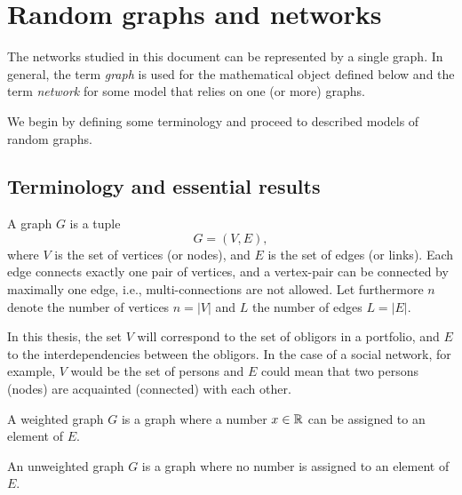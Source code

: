 \chapter{Random graphs and networks} %
\label{cha:graphs_and_networks}


The networks studied in this document can be represented by a single graph.
In general, the term \textit{graph} is used for the mathematical object defined below and the term \textit{network} for some model that relies on one (or more) graphs.

We begin by defining some terminology and proceed to described models of random graphs.

\section{Terminology and essential results} %
\label{sec:definitions_and_essential_results}

\begin{definition}A graph $G$ is a tuple
\begin{equation}
G = (V,E),
\end{equation}
\noindent where $V$ is the set of vertices (or nodes), and $E$ is the set of edges (or links).
Each edge connects exactly one pair of vertices, and a vertex-pair can be connected by maximally one edge, i.e., multi-connections are not allowed.
Let furthermore $n$ denote the number of vertices $n = |V|$ and $L$ the number of edges $L = |E|$.
\end{definition}


In this thesis, the set $V$ will correspond to the set of obligors in a portfolio, and $E$ to the interdependencies between the obligors.
In the case of a social network, for example, $V$ would be the set of persons and $E$ could mean that two persons (nodes) are acquainted (connected) with each other.

\begin{definition}A weighted graph $G$ is a graph where a number $x \in {\mathbb R}$ can be assigned to an element of $E$.\end{definition}

\begin{definition}An unweighted graph $G$ is a graph where no number is assigned to an element of $E$.\end{definition}


